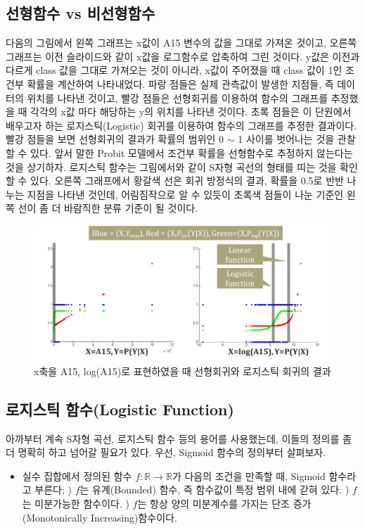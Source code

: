 \documentclass[a4paper]{oblivoir}
\begin{document}
\subsection{선형함수 vs 비선형함수}
다음의 그림에서 왼쪽 그래프는 x값이 A15 변수의 값을 그대로 가져온 것이고, 오른쪽 그래프는 이전 슬라이드와 같이 x값을 로그함수로 압축하여 그린 것이다. y값은 이전과 다르게 class 값을 그대로 가져오는 것이 아니라, x값이 주어졌을 때 class 값이 1인 조건부 확률을 계산하여 나타내었다. 파랑 점들은 실제 관측값이 발생한 지점들, 즉 데이터의 위치를 나타낸 것이고, 빨강 점들은 선형회귀를 이용하여 함수의 그래프를 추정했을 때 각각의 x값 마다 해당하는 y의 위치를 나타낸 것이다. 초록 점들은 이 단원에서 배우고자 하는 로지스틱(Logistic) 회귀를 이용하여 함수의 그래프를 추정한 결과이다. \\
\indent 빨강 점들을 보면 선형회귀의 결과가 확률의 범위인 0 $\sim$ 1 사이를 벗어나는 것을 관찰할 수 있다. 앞서 말한 Probit 모델에서 조건부 확률을 선형함수로 추정하지 않는다는 것을 상기하자. 로지스틱 함수는 그림에서와 같이 S자형 곡선의 형태를 띠는 것을 확인할 수 있다. 오른쪽 그래프에서 황갈색 선은 회귀 방정식의 결과, 확률을 0.5로 반반 나누는 지점을 나타낸 것인데, 어림짐작으로 알 수 있듯이 초록색 점들이 나눈 기준인 왼쪽 선이 좀 더 바람직한 분류 기준이 될 것이다.
\begin{figure}[ht]
\centering
\includegraphics[scale=0.6]{Logistic_Regression_Plot.png}
\caption{x축을 A15, log(A15)로 표현하였을 때 선형회귀와 로지스틱 회귀의 결과}
\label{Figure 4-5}
\end{figure}

\subsection{로지스틱 함수(Logistic Function)}
아까부터 계속 S자형 곡선, 로지스틱 함수 등의 용어를 사용했는데, 이들의 정의를 좀 더 명확히 하고 넘어갈 필요가 있다. 우선, Sigmoid 함수의 정의부터 살펴보자.
\begin{itemize}\itemsep0pt
\item 실수 집합에서 정의된 함수 $f: \mathds{R} \to \mathds{R}$가 다음의 조건을 만족할 때, Sigmoid 함수라고 부른다;
) $f$는 유계(Bounded) 함수, 즉 함수값이 특정 범위 내에 갇혀 있다.
) $f$는 미분가능한 함수이다.
) $f$는 항상 양의 미분계수를 가지는 단조 증가(Monotonically Increasing)함수이다.
\end{itemize}
\end{document}
